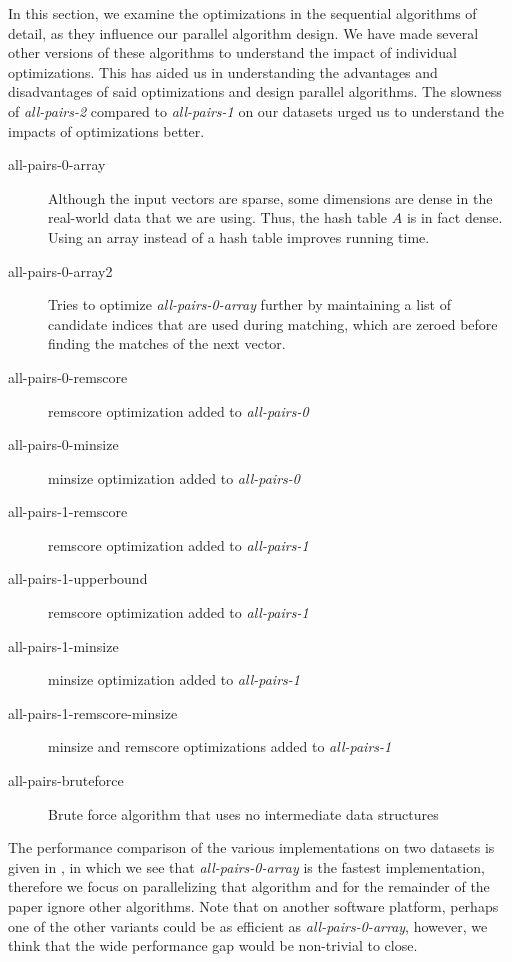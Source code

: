 \documentclass{comjnl}
\newcommand{\var}[1]{\mbox{\textsl{#1}}} %
\begin{document}
In this section, we examine the optimizations in the sequential
algorithms of  detail, as they influence
our parallel algorithm design. 
We have made several other versions of these algorithms
to understand the impact of individual optimizations. This has aided
us in understanding the advantages and disadvantages of said
optimizations and design parallel algorithms. The slowness of
\var{all-pairs-2} compared to \var{all-pairs-1} on our datasets urged us to
understand the impacts of optimizations better.  
\begin{description}
\item[all-pairs-0-array] Although the input vectors are sparse, some
  dimensions are dense in the real-world data that we are using. Thus,
  the hash table $A$ is in fact dense. Using an array instead of a
  hash table improves running time.
\item[all-pairs-0-array2] Tries to optimize \var{all-pairs-0-array} further
  by maintaining a list of candidate indices that are used during
  matching, which are zeroed before finding the matches of the next
  vector.
\item[all-pairs-0-remscore] remscore optimization added to \var{all-pairs-0}
\item[all-pairs-0-minsize] minsize optimization added to \var{all-pairs-0}
\item[all-pairs-1-remscore] remscore optimization added to \var{all-pairs-1}
\item[all-pairs-1-upperbound] remscore optimization added to \var{all-pairs-1}
\item[all-pairs-1-minsize] minsize optimization added to \var{all-pairs-1}
\item[all-pairs-1-remscore-minsize] minsize and remscore optimizations added
  to \var{all-pairs-1}
\item[all-pairs-bruteforce] Brute force algorithm that uses no
  intermediate data structures
\end{description}

The performance comparison of the various implementations on two
datasets is given in , in which we see that
\var{all-pairs-0-array} is the fastest implementation, therefore we focus on
parallelizing that algorithm and for the remainder of the paper ignore
other algorithms. Note that on another software platform, perhaps one
of the other variants could be as efficient as \var{all-pairs-0-array}, however,
we think that the wide performance gap would be non-trivial to close.
\end{document}
